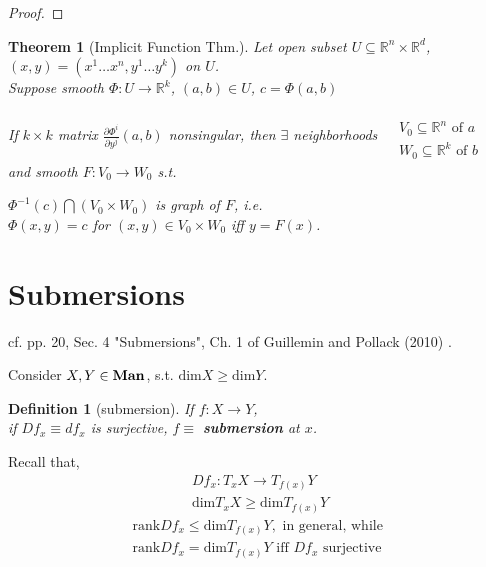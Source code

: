 \documentclass[10pt]{amsart}
\newtheorem{theorem}{Theorem}
\newtheorem{definition}{Definition}
\begin{document}
\begin{multicols*}{2}
\begin{proof}
\end{proof}






\begin{theorem}[Implicit Function Thm.]
  Let open subset $U\subseteq \mathbb{R}^n \times \mathbb{R}^d$, $(x,y) = (x^1 \dots x^n, y^1 \dots y^k) $ on $U$.  \\
  Suppose smooth $\Phi:U\to \mathbb{R}^k$, $(a,b) \in U$, $c=\Phi(a,b)$

  If $k\times k$ matrix $\frac{ \partial \Phi^i}{ \partial y^j}(a,b)$ nonsingular, then $\exists $ neighborhoods $\begin{aligned} & \quad \\
    & V_0 \subseteq \mathbb{R}^n \text{ of $a$ } \\
    & W_0 \subseteq \mathbb{R}^k \text{ of $b$ } \end{aligned}$ and smooth $F:V_0 \to W_0$ s.t.

  $\Phi^{-1}(c) \bigcap (V_0\times W_0)$ is graph of $F$, i.e. \\
  $\Phi(x,y) =c$ for $(x,y) \in V_0\times W_0$ iff $y=F(x)$.  
  \end{theorem}



\section{Submersions} 
cf. pp. 20, Sec. 4 "Submersions", Ch. 1 of Guillemin and Pollack (2010) \cite{VGuilleminAPollack2010}.  

Consider $X,Y\in \text{\textbf{Man}}$, s.t. $\text{dim}X \geq \text{dim}Y$.  

\begin{definition}[submersion] If $f:X\to Y$, \\
if $Df_x \equiv df_x$ is \emph{surjective}, $f\equiv $ \textbf{submersion} at $x$.
\end{definition}
Recall that,  
\[
\begin{gathered}
	Df_x:T_xX \to T_{f(x)}Y \\
	\text{dim}T_xX \geq \text{dim}T_{f(x)}Y
\end{gathered}
\]
\[
\begin{gathered}
\text{rank}Df_x \leq \text{dim}T_{f(x)}Y, \text{ in general, while } \\
\text{rank}Df_x = \text{dim}T_{f(x)}Y \text{ iff } Df_x \text{ surjective }
\end{gathered}
\]


\end{multicols*}
\end{document}
